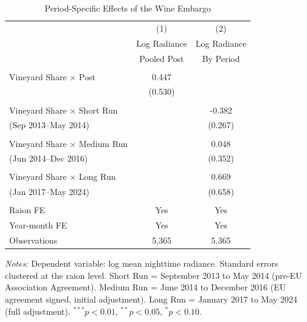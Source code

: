 \begin{table}[t]
\centering
\caption{Period-Specific Effects of the Wine Embargo}
\label{tab:periods}
\begin{tabular}{lcc}
\hline\hline
 & (1) & (2) \\
 & Log Radiance & Log Radiance \\
 & Pooled Post & By Period \\
\hline
\\[-1em]
Vineyard Share $\times$ Post & 0.447 & \\
 & (0.530) & \\
\\[-0.5em]
Vineyard Share $\times$ Short Run & & -0.382 \\
\quad (Sep 2013--May 2014) & & (0.267) \\
\\[-0.5em]
Vineyard Share $\times$ Medium Run & & 0.048 \\
\quad (Jun 2014--Dec 2016) & & (0.352) \\
\\[-0.5em]
Vineyard Share $\times$ Long Run & & 0.669 \\
\quad (Jan 2017--May 2024) & & (0.658) \\
\\[-0.5em]
\hline
Raion FE & Yes & Yes \\
Year-month FE & Yes & Yes \\
Observations & 5,365 & 5,365 \\
\hline\hline
\end{tabular}
\begin{tablenotes}
\item \textit{Notes:} Dependent variable: log mean nighttime radiance.
Standard errors clustered at the raion level.
Short Run = September 2013 to May 2014 (pre-EU Association Agreement).
Medium Run = June 2014 to December 2016 (EU agreement signed, initial adjustment).
Long Run = January 2017 to May 2024 (full adjustment).
$^{***}p<0.01$, $^{**}p<0.05$, $^{*}p<0.10$.
\end{tablenotes}
\end{table}
